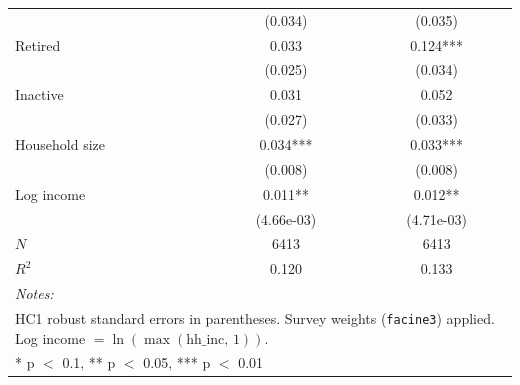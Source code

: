 \begin{table}
\begin{tabular}[t]{lcc}
 & (0.034) & (0.035)\\
\hspace{6pt} Retired & 0.033 & 0.124***\\
 & (0.025) & (0.034)\\
\hspace{6pt} Inactive & 0.031 & 0.052\\
 & (0.027) & (0.033)\\
Household size & 0.034*** & 0.033***\\
 & (0.008) & (0.008)\\
Log income & 0.011** & 0.012**\\
 & (4.66e-03) & (4.71e-03)\\
\midrule
$N$ & 6413 & 6413\\
$R^2$ & 0.120 & 0.133\\
\bottomrule
\multicolumn{3}{l}{\rule{0pt}{1em}\textit{Notes: }}\\
\multicolumn{3}{l}{\rule{0pt}{1em}HC1 robust standard errors in parentheses. Survey weights (\texttt{facine3}) applied. Log income $= \ln(\max(\text{hh\_inc},\,1))$.}\\
\multicolumn{3}{l}{\rule{0pt}{1em}* p $<$ 0.1, ** p $<$ 0.05, *** p $<$ 0.01}\\
\end{tabular}
\end{table}

